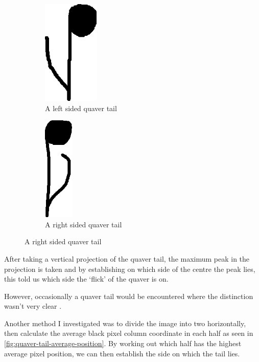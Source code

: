 \begin{figure}[h!]
    \centering

    \begin{subfigure}[b]{.45\linewidth}
        \centering
      \includegraphics[height=5cm]{gfx/techniques/quaver-left-6087.png}
      \caption{A left sided quaver tail}
      \label{fig:quaver-tail-left}
    \end{subfigure}
    \begin{subfigure}[b]{.45\linewidth}
        \centering
      \includegraphics[height=5cm]{gfx/techniques/quaver-right-3083.png}
      \caption{A right sided quaver tail}
      \label{fig:quaver-tail-right}
    \end{subfigure}

\end{figure}

After taking a vertical projection of the quaver tail, the maximum peak in the projection is taken and by establishing on which side of the centre the peak lies, this told us which side the `flick' of the quaver is on.

However, occasionally a quaver tail would be encountered where the distinction wasn't very clear .

Another method I investigated was to divide the image into two horizontally, then calculate the average black pixel column coordinate in each half as seen in \cref{fig:quaver-tail-average-position}. By working out which half has the highest average pixel position, we can then establish the side on which the tail lies.

